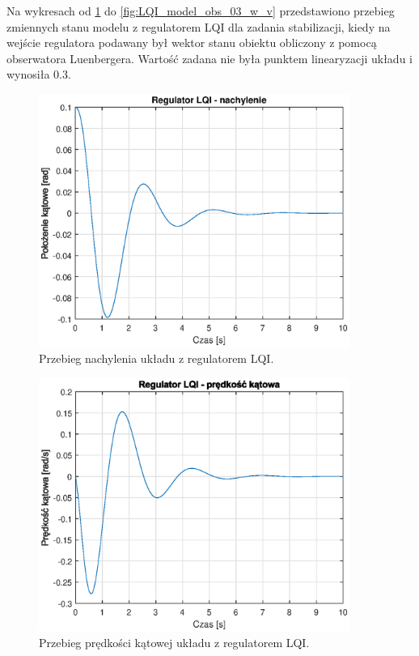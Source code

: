 \documentclass[11pt,a4paper]{article}
\begin{document}
Na wykresach od \ref{fig:LQI_model_obs_03_alpha_v} do \ref{fig:LQI_model_obs_03_w_v} przedstawiono przebieg zmiennych stanu modelu z regulatorem LQI dla zadania stabilizacji, kiedy na wejście regulatora podawany był wektor stanu obiektu obliczony z pomocą obserwatora Luenbergera. Wartość zadana nie była punktem linearyzacji układu i wynosiła 0.3.

\begin{figure}[H]
	\centering
	\includegraphics[width=4in]{Figures/LQI_model_obs_03_alpha_v.eps}
	\caption{Przebieg nachylenia układu z regulatorem LQI.}
	\label{fig:LQI_model_obs_03_alpha_v}
\end{figure}

\begin{figure}[H]
	\centering
	\includegraphics[width=4in]{Figures/LQI_model_obs_03_dalpha_v.eps}
	\caption{Przebieg prędkości kątowej układu z regulatorem LQI.}
	\label{fig:LQI_model_obs_03_dalpha_v}
\end{figure}
\end{document}
